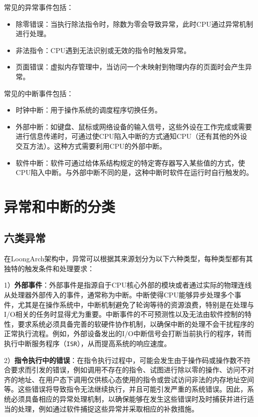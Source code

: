 常见的异常事件包括：

\begin{itemize}
\tightlist
\item
  除零错误：当执行除法指令时，除数为零会导致异常，此时CPU通过异常机制进行处理。
\item
  非法指令：CPU遇到无法识别或无效的指令时触发异常。
\item
  页面错误：虚拟内存管理中，当访问一个未映射到物理内存的页面时会产生异常。
\end{itemize}

常见的中断事件包括：

\begin{itemize}
\tightlist
\item
  时钟中断：用于操作系统的调度程序切换任务。
\item
  外部中断：如键盘、鼠标或网络设备的输入信号，这些外设在工作完成或需要进行信息传递时，可通过使CPU陷入中断的方式通知CPU（还有其他的外设交互方法）。这种方式需要利用CPU的外部中断。
\item
  软件中断：软件可通过给体系结构规定的特定寄存器写入某些值的方式，使CPU陷入中断。与外部中断不同的是，这种中断时软件在运行时自行触发的。
\end{itemize}

\section{异常和中断的分类}\label{sec:07-exceptions-005}

\subsection{六类异常}\label{sec:07-exceptions-006}

在LoongArch架构中，异常可以根据其来源划分为以下六种类型，每种类型都有其独特的触发条件和处理要求：

1）\textbf{外部事件}：外部事件是指源自于CPU核心外部的模块或者通过实际的物理连线从处理器外部传入的事件，通常称为中断。中断使得CPU能够异步处理多个事件，尤其是在操作系统中，中断机制避免了轮询等待的资源浪费，特别是在处理与I/O相关的任务时显得尤为重要。中断事件的不可预测性以及无法由软件控制的特性，要求系统必须具备完善的软硬件协作机制，以确保中断的处理不会干扰程序的正常执行流程。例如，外部设备发出的I/O中断信号会打断当前执行的程序，转而执行中断服务程序（\texttt{ISR}），从而提高系统的响应速度。

2）\textbf{指令执行中的错误}：在指令执行过程中，可能会发生由于操作码或操作数不符合要求而引发的错误，例如调用不存在的指令、试图进行除以零的操作、访问不对齐的地址、在用户态下调用仅供核心态使用的指令或尝试访问非法的内存地址空间等。这些错误将导致指令无法继续执行，并且可能引发严重的系统错误。因此，系统必须具备相应的异常处理机制，以确保能够在发生这些错误时及时捕获并进行适当的处理，例如通过软件捕捉这些异常并采取相应的补救措施。

